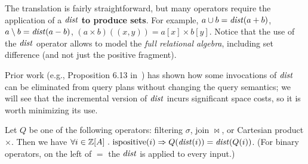 The translation is fairly straightforward, but many operators require
the application of a $\mathit{dist}$ \textbf{to produce sets}.
For example, $a \cup b = \mathit{dist}(a + b)$, $a \setminus b =
\mathit{dist}(a - b)$, $(a \times b)((x,y)) = a[x] \times b[y]$.
%
%
%
%
%
%
%
Notice that the use of the $\mathit{dist}$ operator allows \dbsp to model
the \emph{full relational algebra}, including set difference (and not
just the positive fragment).

Prior work (e.g., Proposition 6.13 in~\cite{green-tcs11}) has shown
how some invocations of $\mathit{dist}$ can be eliminated from query plans
without changing the query semantics; we will see that the incremental
version of $\mathit{dist}$ incurs significant space costs, so it is worth
minimizing its use.

\begin{proposition}\label{prop-distinct-delay}
Let $Q$ be one of the following \zrs operators: filtering $\sigma$,
join $\bowtie$, or Cartesian product $\times$.  Then we have $\forall
i \in \mathbb{Z}[A]~.~\mbox{ispositive}(i) \Rightarrow Q(\mathit{dist}(i)) =
\mathit{dist}(Q(i))$.  (For binary operators, on the left of $=$ the
$\mathit{dist}$ is applied to every input.)
\end{proposition}


